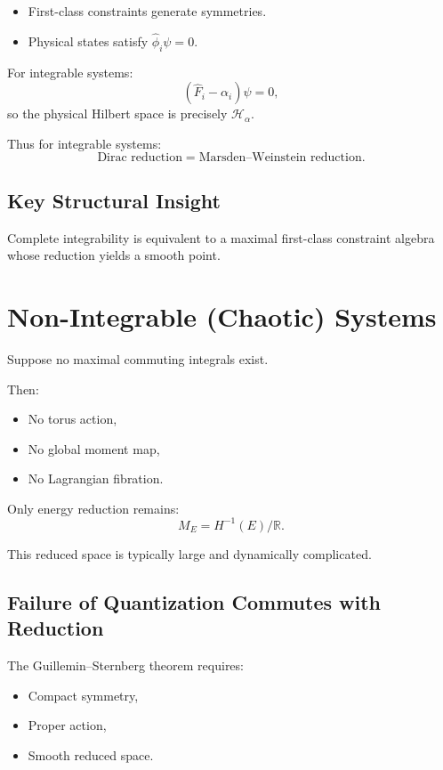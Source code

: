 \documentclass[11pt]{article}
\begin{document}
\begin{itemize}
\item First-class constraints generate symmetries.
\item Physical states satisfy $\hat{\phi}_i\psi=0$.
\end{itemize}

For integrable systems:
\[
(\hat F_i - \alpha_i)\psi = 0,
\]
so the physical Hilbert space is precisely $\mathcal{H}_\alpha$.

Thus for integrable systems:
\[
\text{Dirac reduction} = \text{Marsden--Weinstein reduction}.
\]

\subsection{Key Structural Insight}

Complete integrability is equivalent to a maximal first-class constraint algebra whose reduction yields a smooth point.

\section{Non-Integrable (Chaotic) Systems}

Suppose no maximal commuting integrals exist.

Then:

\begin{itemize}
\item No torus action,
\item No global moment map,
\item No Lagrangian fibration.
\end{itemize}

Only energy reduction remains:
\[
M_E = H^{-1}(E)/\mathbb{R}.
\]

This reduced space is typically large and dynamically complicated.

\subsection{Failure of Quantization Commutes with Reduction}

The Guillemin--Sternberg theorem requires:

\begin{itemize}
\item Compact symmetry,
\item Proper action,
\item Smooth reduced space.
\end{itemize}
\end{document}

